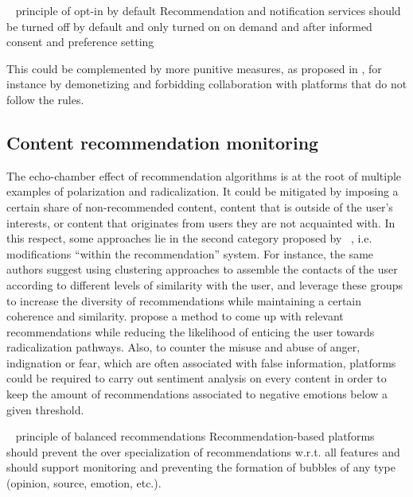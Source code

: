 \documentclass[10pt]{article}
\begin{document}
\begin{principle}{\faThumbTack ~ principle of opt-in by default}
Recommendation and notification services should be turned off by default and only turned on on demand and after informed consent and preference setting
\end{principle} 

This could be complemented by more punitive measures, as proposed in \cite{mudde2017populism}, for instance by demonetizing and forbidding collaboration with platforms that do not follow the rules.



\subsection{Content recommendation monitoring}
The echo-chamber effect of recommendation algorithms is at the root of multiple examples of polarization and radicalization. It could be mitigated by imposing a certain share of non-recommended content, content that is outside of the user's interests, or content that originates from users they are not acquainted with.
%
In this respect, some approaches lie in the second category proposed by ~\cite{fernandez_analysing_2021}, i.e. modifications ``within the recommendation'' system. 
For instance, the same authors suggest using clustering approaches to assemble the contacts of the user according to different levels of similarity with the user, and leverage these groups to increase the diversity of recommendations while maintaining a certain coherence and similarity.
\cite{fabbri_rewiring_2022} propose a method to come up with relevant recommendations while reducing the likelihood of enticing the user towards radicalization pathways.
Also, to counter the misuse and abuse of anger, indignation or fear, which are often associated with false information, platforms could be required to carry out sentiment analysis on every content in order to keep the amount of recommendations associated to negative emotions below a given threshold.

\begin{principle}{\faThumbTack ~ principle of balanced recommendations}
Recommendation-based platforms should prevent the over specialization of recommendations w.r.t. all features and should support monitoring and preventing the formation of bubbles of any type (opinion, source, emotion, etc.).
\end{principle} 
\end{document}
